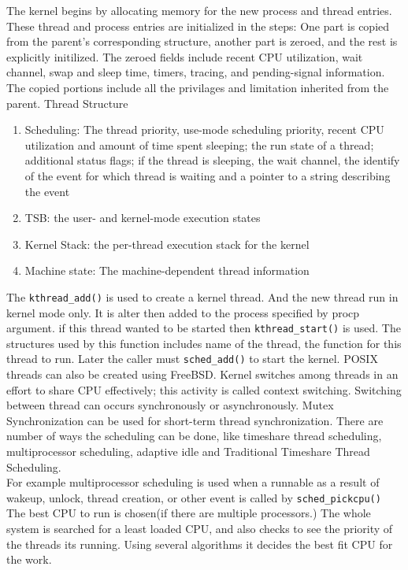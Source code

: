 \documentclass[letterpaper,10pt,draftclsnofoot,onecolumn]{IEEEtran}
\begin{document}
The kernel begins by allocating memory for the new process and thread entries. These thread and process entries are initialized in the steps: One part is copied from the parent's corresponding structure, another part is zeroed, and the rest is explicitly initilized. The zeroed fields include recent CPU utilization, wait channel, swap and sleep time, timers, tracing, and pending-signal information. The copied portions include all the privilages and limitation inherited from the parent.
Thread Structure
\begin{enumerate}
\item Scheduling: The thread priority, use-mode scheduling priority, recent CPU utilization and amount of time spent sleeping; the run state of a thread; additional status flags; if the thread is sleeping, the wait channel, the identify of the event for which thread is waiting and a pointer to a string describing the event
\item TSB: the user- and kernel-mode execution states
\item Kernel Stack: the per-thread execution stack for the kernel
\item Machine state: The machine-dependent thread information\cite{[2]} \\
\end{enumerate}
The \verb|kthread_add()| is used to create a kernel thread. And the new thread run in kernel mode only. It is alter then added to the process specified by procp argument. if this thread wanted to be started then \verb|kthread_start()| is used. The structures used by this function includes name of the thread, the function for this thread to run. Later the caller must \verb|sched_add()| to start the kernel. POSIX threads can also be created using FreeBSD.
Kernel switches among threads in an effort to share CPU effectively; this activity is called context switching. Switching between thread can occurs synchronously or asynchronously. Mutex Synchronization can be used for short-term thread synchronization.
There are number of ways the scheduling can be done, like timeshare thread scheduling, multiprocessor scheduling, adaptive idle and Traditional Timeshare Thread Scheduling.\\
For example multiprocessor scheduling is used when a runnable as a result of wakeup, unlock, thread creation, or other event is called by \verb|sched_pickcpu()| The best CPU to run is chosen(if there are multiple processors.) The whole system is searched for a least loaded CPU, and also checks to see the priority of the threads its running. Using several algorithms it decides the best fit CPU for the work.\cite{[2]}
\end{document}
